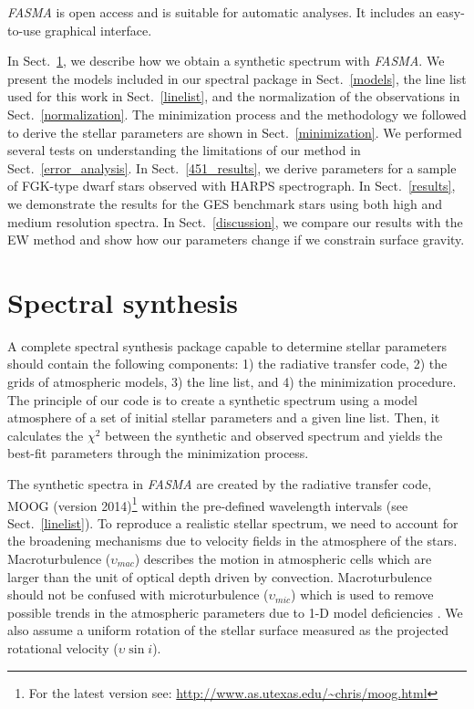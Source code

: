 \documentclass[fleqn,usenatbib]{mnras}
\begin{document}
\textit{FASMA} is open access and is suitable for automatic analyses. It includes an easy-to-use graphical interface.

In Sect.~\ref{synthesis}, we describe how we obtain a synthetic spectrum with \textit{FASMA}. We present the models included in our spectral package in Sect.~\ref{models}, the line list used 
for this work in Sect.~\ref{linelist}, and the normalization of the observations in Sect.~\ref{normalization}. The minimization process and the methodology we followed to derive the stellar 
parameters are shown in Sect.~\ref{minimization}. We performed several tests on understanding the limitations of our method in Sect.~\ref{error_analysis}. In Sect.~\ref{451_results}, we derive 
parameters for a sample of FGK-type dwarf stars observed with HARPS spectrograph. In Sect.~\ref{results}, we demonstrate the results for the GES benchmark stars using both high and medium 
resolution spectra. In Sect.~\ref{discussion}, we compare our results with the EW method and show how our parameters change if we constrain surface gravity. 

\section{Spectral synthesis}\label{synthesis}

A complete spectral synthesis package capable to determine stellar parameters should contain the following components: 
1) the radiative transfer code, 2) the grids of atmospheric models, 3) the line list, and 4) the minimization procedure.
The principle of our code is to create a synthetic spectrum using a model atmosphere of a set of initial stellar parameters and a given line list. 
Then, it calculates the $\chi^{2}$ between the synthetic and observed spectrum and yields the best-fit parameters through the minimization process.

The synthetic spectra in \textit{FASMA} are created by the radiative transfer code, MOOG (version 2014)\footnote{For the latest version see:
\url{http://www.as.utexas.edu/~chris/moog.html}} within the pre-defined wavelength intervals (see Sect.~\ref{linelist}). To reproduce a realistic stellar spectrum, we 
need to account for the broadening mechanisms due to velocity fields in the atmosphere of the stars. Macroturbulence ($\upsilon_{mac}$) describes the motion in atmospheric 
cells which are larger than the unit of optical depth driven by convection. Macroturbulence should not be confused 
with microturbulence ($\upsilon_{mic}$) which is used to remove possible trends in the atmospheric parameters due to 1-D model deficiencies \citep[for details see][]{Gray2005}. 
We also assume a uniform rotation of the stellar surface measured as the projected rotational velocity ($\upsilon\sin i$).
\end{document}
